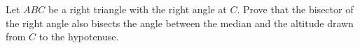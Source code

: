 Let $ABC$ be a right triangle with the right angle at $C$. Prove that the bisector of the right angle also bisects the angle between the median and the altitude drawn from $C$ to the hypotenuse.
